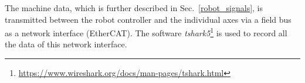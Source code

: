 \documentclass[journal]{IEEEtran}
\begin{document}
The machine data, which is further described in Sec.~\ref{robot_signals}, is transmitted between the robot controller and the individual axes via a field bus as a network interface (EtherCAT).
The software \textit{tshark5}\footnote{\href{
https://www.wireshark.org/docs/man-pages/tshark.html}{
https://www.wireshark.org/docs/man-pages/tshark.html}} is used to record all the data of this network interface.
\newcommand\aux{auxiliary}
\newcommand\nom{target}
\newcommand\meas{measurement}
\newcommand\ang{$\mathrm{rad}$}
\newcommand\trq{$\mathrm{Nm}$}
\newcommand\volt{$\mathrm{V}$}
\newcommand\pwr{$\mathrm{W}$}
\newcommand\cur{$\mathrm{A}$}
\newcommand\estimated{estimation}
\begin{table}[!t]
\centering
{}
\end{table}
\end{document}
